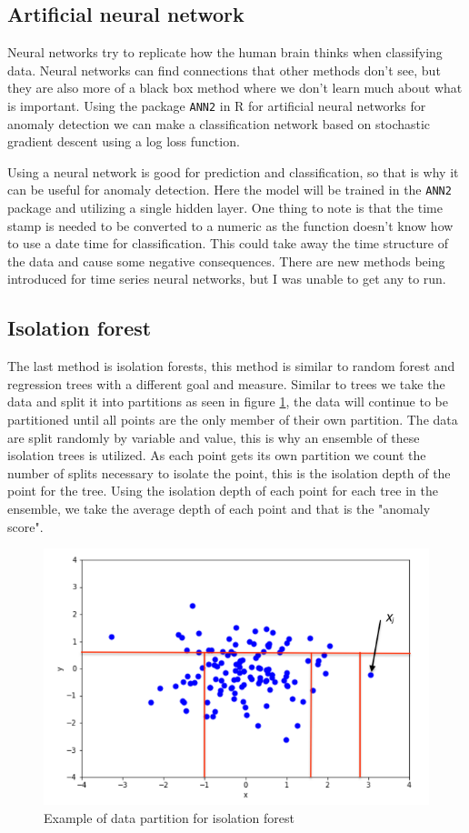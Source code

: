 \documentclass{article}
\begin{document}
\subsection{Artificial neural network}
Neural networks try to replicate how the human brain thinks when classifying data. Neural networks can find connections that other methods don't see, but they are also more of a black box method where we don't learn much about what is important. Using the package \texttt{ANN2} in R for artificial neural networks for anomaly detection we can make a classification network based on stochastic gradient descent using a log loss function.

Using a neural network is good for prediction and classification, so that is why it can be useful for anomaly detection. Here the model will be trained in the \texttt{ANN2} package and utilizing a single hidden layer. One thing to note is that the time stamp is needed to be converted to a numeric as the function doesn't know how to use a date time for classification. This could take away the time structure of the data and cause some negative consequences. There are new methods being introduced for time series neural networks, but I was unable to get any to run.

\subsection{Isolation forest}
The last method is isolation forests, this method is similar to random forest and regression trees with a different goal and measure. Similar to trees we take the data and split it into partitions as seen in figure \ref{fig:iso_fig}, the data will continue to be partitioned until all points are the only member of their own partition. The data are split randomly by variable and value, this is why an ensemble of these isolation trees is utilized. As each point gets its own partition we count the number of splits necessary to isolate the point, this is the isolation depth of the point for the tree. Using the isolation depth of each point for each tree in the ensemble, we take the average depth of each point and that is the "anomaly score".

\begin{figure}[ht]
    \centering
    \includegraphics[width=.7\textwidth]{../Isolating_an_Anomalous_Point.png}
    \caption{Example of data partition for isolation forest}
    \label{fig:iso_fig}
\end{figure}
\end{document}
